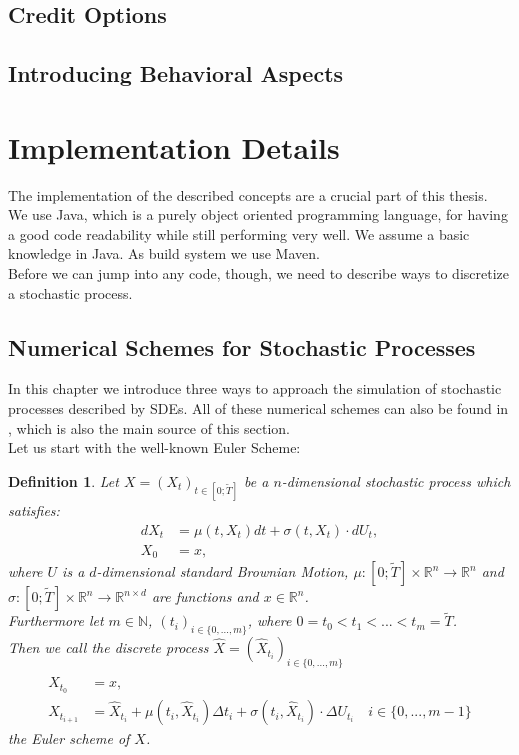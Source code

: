 \documentclass[12pt]{article}
\newtheorem{definition}[theorem]{Definition}
\begin{document}
	\subsection{Credit Options}
	
	\subsection{Introducing Behavioral Aspects}
	
	
	
	
	
	\pagebreak
	\section{Implementation Details}
	The implementation of the described concepts are a crucial part of this thesis.\\
	We use Java, which is a purely object oriented programming language, for having a good  code readability while still performing very well. We assume a basic knowledge in Java.
	As build system we use Maven.\\
	Before we can jump into any code, though, we need to describe ways to discretize a stochastic process.
	
	\subsection{Numerical Schemes for Stochastic Processes}
	In this chapter we introduce three ways to approach the simulation of stochastic processes described by SDEs. All of these numerical schemes can also be found in \cite{kloedenSchemes}, which is also the main source of this section.\\
	Let us start with the well-known Euler Scheme:
	\begin{definition}
		Let $X=(X_t)_{t\in [0;\tilde{T}]}$ be a $n$-dimensional stochastic process which satisfies:
		\begin{align*}
			dX_t &= \mu(t, X_t)dt + \sigma(t, X_t) \cdot dU_t,\\
			X_0 &= x,
		\end{align*}
		where $U$ is a $d$-dimensional standard Brownian Motion, $\mu: [0;\tilde{T}] \times \mathbb{R}^n \rightarrow \mathbb{R}^n$ and $\sigma: [0;\tilde{T}] \times \mathbb{R}^n \rightarrow \mathbb{R}^{n \times d}$ are functions and $x \in \mathbb{R}^n$.\\
		Furthermore let $m \in \mathbb{N}$, $(t_i)_{i\in \{0, ..., m\}}$, where $0=t_0 < t_1 < ... < t_m=\tilde{T}$.\\
		Then we call the discrete process $\hat{X} = (\hat{X}_{t_i})_{i \in \{0, ..., m\}}$
		\begin{align*}
			\hat{X}_{t_0} &= x,\\
			\hat{X}_{t_{i+1}} &= \hat{X}_{t_{i}} + \mu(t_i, \hat{X}_{t_{i}})\Delta t_i + \sigma(t_i, \hat{X}_{t_{i}}) \cdot \Delta U_{t_i} \quad i \in \{0, ..., m-1\}
		\end{align*}
		the \emph{Euler scheme} of $X$.
	\end{definition}	
	
\end{document}
